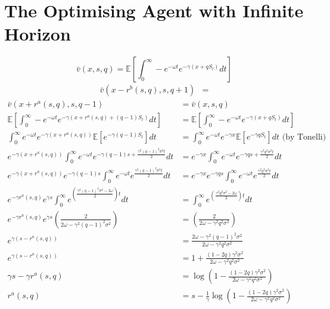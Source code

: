 \section{The Optimising Agent with Infinite Horizon}
\begin{equation*}
    \bar v(x,s,q)=\mathbb{E}\left[\int_{0}^{\infty}-e^{-\omega t}e^{-\gamma(x+qS_t)}dt\right]
\end{equation*}
\begin{align*}
    \bar{v}(x-r^b(s,q),s,q+1)&=
\end{align*}
\begin{align*}
    \bar{v}(x+r^a(s,q),s,q-1)&=\bar{v}(x,s,q)\\
    \mathbb{E}\left[\int_{0}^{\infty}-e^{-\omega t}e^{-\gamma(x+r^a(s,q)+(q-1)S_t)}dt\right]&=\mathbb{E}\left[\int_{0}^{\infty}-e^{-\omega t}e^{-\gamma(x+qS_t)}dt\right]\\
    \int_{0}^{\infty}e^{-\omega t}e^{-\gamma(x+r^a(s,q))}\mathbb{E}\left[e^{-\gamma(q-1)S_t}\right]dt&=\int_{0}^{\infty}e^{-\omega t}e^{-\gamma x}\mathbb{E}\left[e^{-\gamma qS_t}\right]dt\textrm{ (by Tonelli)}\\
    e^{-\gamma(x+r^a(s,q))}\int_{0}^{\infty}e^{-\omega t}e^{-\gamma(q-1)s+\frac{\gamma^2(q-1)^2\sigma^2t}{2}}dt&=e^{-\gamma x}\int_{0}^{\infty}e^{-\omega t}e^{-\gamma qs+\frac{\gamma^2q^2\sigma^2t}{2}}dt\\
    e^{-\gamma(x+r^a(s,q))}e^{-\gamma(q-1)s}\int_{0}^{\infty}e^{-\omega t}e^{\frac{\gamma^2(q-1)^2\sigma^2t}{2}}dt&=e^{-\gamma x}e^{-\gamma qs}\int_{0}^{\infty}e^{-\omega t}e^{\frac{\gamma^2q^2\sigma^2t}{2}}dt\\
    e^{-\gamma r^a(s,q)}e^{\gamma s}\int_{0}^{\infty}e^{\left(\frac{\gamma^2(q-1)^2\sigma^2-2\omega}{2}\right)t}dt&=\int_{0}^{\infty}e^{\left(\frac{\gamma^2q^2\sigma^2-2\omega}{2}\right)t}dt\\
    e^{-\gamma r^a(s,q)}e^{\gamma s}\left(\frac{2}{2\omega-\gamma^2(q-1)^2\sigma^2}\right)&=\left(\frac{2}{2\omega-\gamma^2q^2\sigma^2}\right)\\
    e^{\gamma(s-r^a(s,q))}&=\frac{2\omega-\gamma^2(q-1)^2\sigma^2}{2\omega-\gamma^2q^2\sigma^2}\\
    e^{\gamma(s-r^a(s,q))}&=1+\frac{(1-2q)\gamma^2\sigma^2}{2\omega-\gamma^2q^2\sigma^2}\\
    \gamma s - \gamma r^a(s,q)&=\log\left(1-\frac{(1-2q)\gamma^2\sigma^2}{2\omega-\gamma^2q^2\sigma^2}\right)\\
    r^a(s,q) &= s-\frac{1}{\gamma}\log\left(1-\frac{(1-2q)\gamma^2\sigma^2}{2\omega-\gamma^2q^2\sigma^2}\right)
\end{align*}

